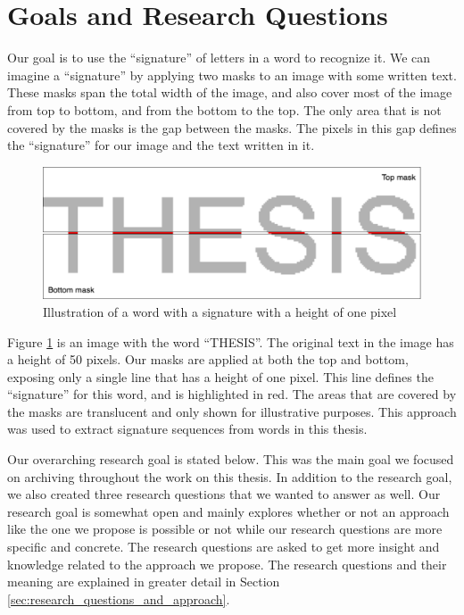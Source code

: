 
\section{Goals and Research Questions}
\label{sec:goals_and_research_questions}
Our goal is to use the ``signature'' of letters in a word to recognize it. We can imagine a ``signature'' by applying two masks to an image with some written text. These masks span the total width of the image, and also cover most of the image from top to bottom, and from the bottom to the top. The only area that is not covered by the masks is the gap between the masks. The pixels in this gap defines the ``signature'' for our image and the text written in it.

\begin{figure}[ht]
    \centering
    \includegraphics[width=1.\textwidth]{fig/chapter1/signature2.png}
    \caption{Illustration of a word with a signature with a height of one pixel}
    \label{fig:thesis-signature}
\end{figure}

Figure \ref{fig:thesis-signature} is an image with the word ``THESIS''. The original text in the image has a height of 50 pixels. Our masks are applied at both the top and bottom, exposing only a single line that has a height of one pixel. This line defines the ``signature'' for this word, and is highlighted in red. The areas that are covered by the masks are translucent and only shown for illustrative purposes. This approach was used to extract signature sequences from words in this thesis.

Our overarching research goal is stated below. This was the main goal we focused on archiving throughout the work on this thesis. In addition to the research goal, we also created three research questions that we wanted to answer as well. Our research goal is somewhat open and mainly explores whether or not an approach like the one we propose is possible or not while our research questions are more specific and concrete. The research questions are asked to get more insight and knowledge related to the approach we propose. The research questions and their meaning are explained in greater detail in Section \ref{sec:research_questions_and_approach}.


